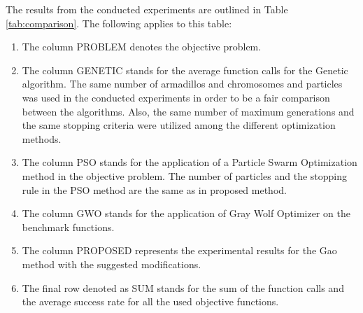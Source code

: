 \documentclass[journal,article,submit,pdftex,moreauthors]{Definitions/mdpi}
\begin{document}
 The  results  from the conducted experiments  are outlined in Table \ref{tab:comparison}. The following applies to this table:
\begin{enumerate}
    \item  The column PROBLEM denotes the objective problem.
    \item  The column GENETIC stands for the average function calls for the Genetic algorithm. The same number of armadillos and chromosomes and particles was used in the conducted experiments in order to be a fair comparison between the algorithms. Also, the same number of maximum generations and the same stopping criteria were utilized among the different optimization methods.
    \item The column PSO stands for the application of a Particle Swarm Optimization method  in the objective problem. The number of particles and the stopping rule in the PSO method are the same as in proposed method.
    \item The column GWO stands for the application of Gray Wolf Optimizer \cite{gwo_paper} on the benchmark functions. 
    \item  The column PROPOSED represents the experimental results for the Gao method with the suggested modifications. 
    \item  The final row denoted as SUM stands for the sum of the function calls and the average success rate for all the used objective functions.
\end{enumerate}
\end{document}
